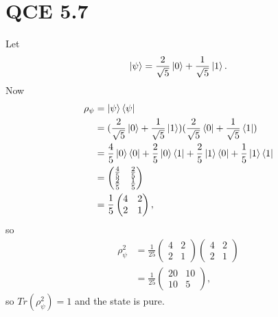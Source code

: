 \documentclass[10pt]{article}
\begin{document}
\section*{QCE 5.7}
Let 
\[
\ket{\psi}= \frac{2}{\sqrt{5}} \ket{0} + \frac{1}{\sqrt{5}} \ket{1}.
\]
Now 
\begin{align*}
\rho_{\psi} &= \ket{\psi} \bra{\psi} \\
                  &= (\frac{2}{\sqrt{5}} \ket{0} + \frac{1}{\sqrt{5}} \ket{1}) (\frac{2}{\sqrt{5}} \bra{0} + \frac{1}{\sqrt{5}} \bra{1}) \\
                  &= \frac{4}{5} \ket{0} \bra{0} + \frac{2}{5} \ket{0} \bra{1} + \frac{2}{5} \ket{1} \bra{0} + \frac{1}{5} \ket{1} \bra{1} \\
                  &= \begin{pmatrix}
                  \frac{4}{5} & \frac{2}{5} \\
                  \frac{2}{5} & \frac{1}{5}
                  \end{pmatrix} \\
     &= \frac{1}{5}
     \begin{pmatrix}
	4 & 2 \\
	2 & 1     
     \end{pmatrix},
\end{align*}
so 
\begin{align*}
\rho_{\psi}^2 &= \frac{1}{25}
\begin{pmatrix}
				4 & 2 \\
				2 & 1
\end{pmatrix}
\begin{pmatrix}
				4 & 2 \\
				2 & 1
\end{pmatrix} \\
&= \frac{1}{25} \begin{pmatrix}
20 & 10 \\
10 & 5
\end{pmatrix},
\end{align*}
so $Tr(\rho_{\psi}^2) = 1$ and the state is pure.
\end{document}
